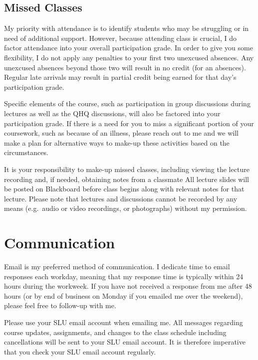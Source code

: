\documentclass[
]{book}
\begin{document}
\hypertarget{missed-classes}{%
\subsection{Missed Classes}\label{missed-classes}}

My priority with attendance is to identify students who may be struggling or in need of additional support. However, because attending class is crucial, I do factor attendance into your overall participation grade. In order to give you some flexibility, I do not apply any penalties to your first two unexcused absences. Any unexcused absences beyond those two will result in no credit (for an absences). Regular late arrivals may result in partial credit being earned for that day's participation grade.

Specific elements of the course, such as participation in group discussions during lectures as well as the QHQ discussions, will also be factored into your participation grade. If there is a need for you to miss a significant portion of your coursework, such as because of an illness, please reach out to me and we will make a plan for alternative ways to make-up these activities based on the circumstances.

It is your responsibility to make-up missed classes, including viewing the lecture recording and, if needed, obtaining notes from a classmate All lecture slides will be posted on Blackboard before class begins along with relevant notes for that lecture. Please note that lectures and discussions cannot be recorded by any means (e.g.~audio or video recordings, or photographs) without my permission.

\hypertarget{communication}{%
\section{Communication}\label{communication}}

Email is my preferred method of communication. I dedicate time to email responses each workday, meaning that my response time is typically within 24 hours during the workweek. If you have not received a response from me after 48 hours (or by end of business on Monday if you emailed me over the weekend), please feel free to follow-up with me.

Please use your SLU email account when emailing me. All messages regarding course updates, assignments, and changes to the class schedule including cancellations will be sent to your SLU email account. It is therefore imperative that you check your SLU email account regularly.
\end{document}
